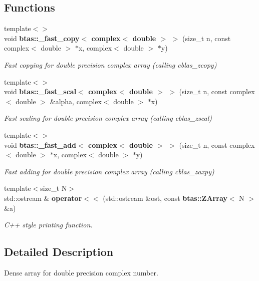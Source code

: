 \subsection*{Functions}
\begin{DoxyCompactItemize}
\item 
{\footnotesize template$<$$>$ }\\void {\bf btas\-::\-\_\-fast\-\_\-copy$<$ complex$<$ double $>$ $>$} (size\-\_\-t n, const complex$<$ double $>$ $\ast$x, complex$<$ double $>$ $\ast$y)
\begin{DoxyCompactList}\small\item\em Fast copying for double precision complex array (calling cblas\-\_\-zcopy) \end{DoxyCompactList}\item 
{\footnotesize template$<$$>$ }\\void {\bf btas\-::\-\_\-fast\-\_\-scal$<$ complex$<$ double $>$ $>$} (size\-\_\-t n, const complex$<$ double $>$ \&alpha, complex$<$ double $>$ $\ast$x)
\begin{DoxyCompactList}\small\item\em Fast scaling for double precision complex array (calling cblas\-\_\-zscal) \end{DoxyCompactList}\item 
{\footnotesize template$<$$>$ }\\void {\bf btas\-::\-\_\-fast\-\_\-add$<$ complex$<$ double $>$ $>$} (size\-\_\-t n, const complex$<$ double $>$ $\ast$x, complex$<$ double $>$ $\ast$y)
\begin{DoxyCompactList}\small\item\em Fast adding for double precision complex array (calling cblas\-\_\-zaxpy) \end{DoxyCompactList}\item 
{\footnotesize template$<$size\-\_\-t N$>$ }\\std\-::ostream \& {\bf operator$<$$<$} (std\-::ostream \&ost, const {\bf btas\-::\-Z\-Array}$<$ N $>$ \&a)
\begin{DoxyCompactList}\small\item\em C++ style printing function. \end{DoxyCompactList}\end{DoxyCompactItemize}


\subsection{Detailed Description}
Dense array for double precision complex number. 

